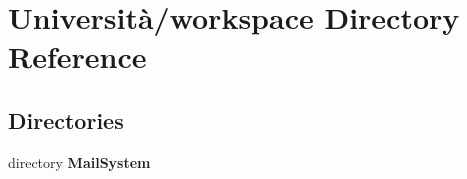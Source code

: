 \section{Università/workspace Directory Reference}
\label{dir_1d27d37f1085e46ef1fe1510f163e93a}
\subsection*{Directories}
\begin{DoxyCompactItemize}
\item 
directory \textbf{ Mail\+System}
\end{DoxyCompactItemize}

